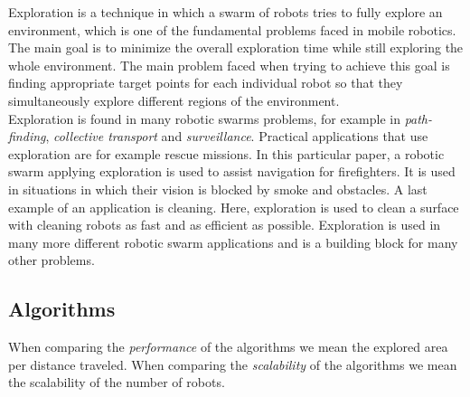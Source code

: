 
Exploration is a technique in which a swarm of robots tries to fully explore an environment, which is one of the fundamental problems faced in mobile robotics.
The main goal is to minimize the overall exploration time while still exploring the whole environment. 
The main problem faced when trying to achieve this goal is finding appropriate target points for each individual robot so that they simultaneously explore different regions of the environment. \cite{burgard2005coordinated} \\
Exploration is found in many robotic swarms problems, for example in \emph{path-finding}, \emph{collective transport} and \emph{surveillance}.
Practical applications that use exploration are for example rescue missions. \cite{Naghsh2008,Penders2011}
In this particular paper, a robotic swarm applying exploration is used to assist navigation for firefighters.
It is used in situations in which their vision is blocked by smoke and obstacles. 
A last example of an application is cleaning. \cite{wagner2008cooperative}
Here, exploration is used to clean a surface with cleaning robots as fast and as efficient as possible. 
Exploration is used in many more different robotic swarm applications and is a building block for many other problems.

 

\subsection{Algorithms}
When comparing the \emph{performance} of the algorithms we mean the explored area per distance traveled. When comparing the \emph{scalability} of the algorithms we mean the scalability of the number of robots.

